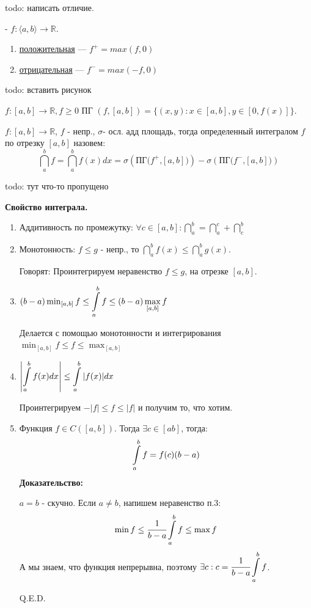 todo: написать отличие.

  - $f:\langle a,b\rangle \rightarrow \mathbb{R} $.
\begin{enumerate}
    \item \uline{положительная} --- $f^+ = max(f,0)$
    \item \uline{отрицательная} --- $f^- = max(-f,0)$
\end{enumerate}

todo: вставить рисунок

 $f:[a,b] \rightarrow \mathbb{R}, f\geq 0$ ПГ $(f,[a,b]) = \{(x,y): x\in [a,b], y \in [0,f(x)]\}$.

 $f: [a,b] \rightarrow \mathbb{R}$, $f$ - непр., $\sigma $- осл. адд площадь, тогда определенный интегралом $f$ по отрезку $[a,b]$ назовем: $$\dint\limits_{a}^b f =\dint\limits_{a}^b f(x) dx =\sigma(\text{ПГ($f^+$,$[a,b]$)})-\sigma(\text{ПГ($f^-$,$[a,b]$)})$$

todo: тут что-то пропущено

\textbf{Свойство интеграла.}
\begin{enumerate}
    \item Аддитивность по промежутку: $\forall c \in [a,b]:\dint\limits_{a}^b =\dint\limits_{a}^c + \dint\limits_{c}^b $
    \item Монотонность: $f\leq g$ - непр., то $\dint\limits_{a}^b f(x)\leq \dint\limits_{a}^b g(x)$. 

    Говорят: Проинтегрируем неравенство $f\leq g$, на отрезке $[a,b]$.

    \item $(b-a)\min_{[a,b]} f \leq\displaystyle\int\limits_{a}^{b}f\leq (b-a)\max_{[a,b]}f$

    Делается с помощью монотонности и интегрирования $\min_{[a,b]}f\leq f\leq\max_{[a,b]}$

    \item $\left|\displaystyle\int\limits_{a}^{b}f(x)dx\right|\leq \displaystyle\int\limits_{a}^{b}|f(x)|dx$

    Проинтегрируем $-|f|\leq f\leq |f|$ и получим то, что хотим.

    \item {}

    Функция $f \in C([a,b])$. Тогда $\exists c \in [ab]$, тогда:
    $$\displaystyle\int\limits_{a}^{b}f = f(c)(b-a)$$
    \textbf{Доказательство:} 
    
    $a=b$ - скучно. Если $a\neq b$, напишем неравенство п.3:
    $$\min f\leq \cfrac{1}{b-a}\displaystyle\int\limits_{a}^{b}f\leq \max f$$ А мы знаем, что функция непрерывна, поэтому $\exists c: c = \cfrac{1}{b-a}\displaystyle\int\limits_{a}^{b}f$. 
    
    \hfill Q.E.D.
\end{enumerate}

